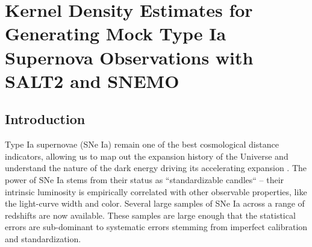 \chapter{Kernel Density Estimates for Generating Mock Type Ia Supernova Observations with SALT2 and SNEMO}

\section{Introduction}
Type Ia supernovae (SNe Ia) remain one of the best cosmological distance indicators, allowing us to map out the expansion history of the Universe and understand the nature of the dark energy driving its accelerating expansion \parencite{Perlmutter1999, Riess1998}. The power of SNe Ia stems from their status as ``standardizable candles`` -- their intrinsic luminosity is empirically correlated with other observable properties, like the light-curve width and color. Several large samples of SNe Ia across a range of redshifts are now available. These samples are large enough that the statistical errors are sub-dominant to systematic errors stemming from imperfect calibration and standardization.

